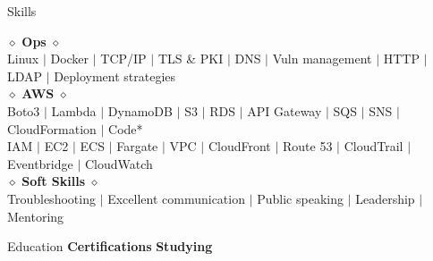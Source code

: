 \documentclass{resume} %
\begin{document}
{\begin{rSection}{Skills}
\begin{center}
				$\diamond$ {\bf Ops} $\diamond$ \\
				Linux $\mid$ Docker $\mid$ TCP/IP $\mid$ TLS \& PKI $\mid$ DNS $\mid$ Vuln management $\mid$ HTTP $\mid$ LDAP $\mid$ Deployment strategies\\
				
				$\diamond$ {\bf AWS} $\diamond$ \\ Boto3 $\mid$ Lambda $\mid$ DynamoDB $\mid$ S3 $\mid$ RDS $\mid$ API Gateway $\mid$ SQS $\mid$ SNS $\mid$ CloudFormation $\mid$ Code*\\ IAM $\mid$ EC2 $\mid$ ECS $\mid$ Fargate $\mid$ VPC $\mid$ CloudFront $\mid$ Route 53 $\mid$ CloudTrail $\mid$ Eventbridge $\mid$ CloudWatch  \\
				$\diamond$ {\bf Soft Skills} $\diamond$ \\
				Troubleshooting $\mid$ Excellent communication $\mid$ Public speaking $\mid$ Leadership $\mid$ Mentoring\\
			\end{center}
			\vspace{-2ex}
		\end{rSection}
	\begin{rSection}{Education}
		{\bf \quad \quad \quad \quad \quad Certifications} \hfill {\bf Studying \quad \quad \quad \quad \quad \quad}\hfill \\

\end{rSection}}
\end{document}
